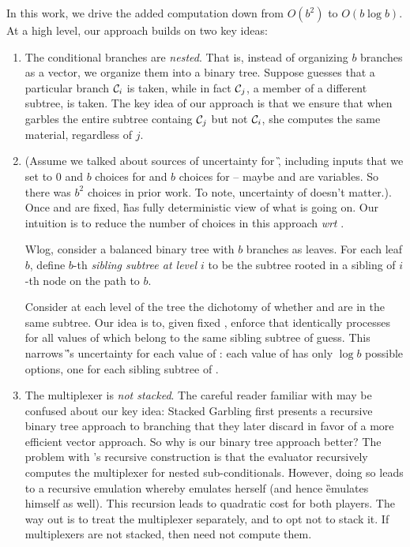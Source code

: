 In this work, we drive the added computation down from $O(b^2)$ to
$O(b \log b)$.
At a high level, our approach builds on two key ideas:
\begin{enumerate}
  \item The conditional branches are \emph{nested}.
    That is, instead of organizing $b$ branches as a vector, we
    organize them into a binary tree.
    Suppose \E guesses that a particular branch $\mathcal{C}_i$ is taken,
    while in fact $\mathcal{C}_j$, a member of a different subtree, is taken.
    The key idea of our approach is that we ensure that when \ev
    garbles the entire subtree containg $\mathcal{C}_j$ but not $\mathcal{C}_i$, she
    computes the same material, regardless of $j$.
    
  \item (Assume we talked about sources of uncertainty for \G, including inputs that we set to 0 and $b$ choices for \guess and $b$ choices for \truth -- maybe \guess and \truth are variables. So there was $b^2$ choices in prior work. To note, uncertainty of \E doesn't matter.). Once \guess and \truth are fixed, \G has fully deterministic view of what is going on.  Our intuition is to reduce the number of \truth choices in this approach {\em wrt  \guess}. 
  
  Wlog, consider a balanced binary tree with $b$ branches as leaves. 
  For each leaf $b$, define $b$-th {\em sibling subtree at level $i$} to be the subtree rooted in a sibling of $i$-th node on the path to $b$.
  
  Consider at each level of the tree the dichotomy of whether \guess and \truth are in the same subtree. Our idea is to, given fixed \guess, enforce that \E identically processes \guess for all values of \truth which belong to the same sibling subtree of guess. This narrows \G’s uncertainty for each value of \guess: each value of \guess has only $\log b$ possible \truth options, one for each sibling subtree of \guess.
    
  \item The multiplexer is \emph{not stacked}.
    The careful reader familiar with \cite{EPRINT:HeaKol20b} may be
    confused about our key idea: Stacked Garbling first presents a
    recursive binary tree approach to branching that they later
    discard in favor of a more efficient vector approach.
    So why is our binary tree approach better?
    The problem with \cite{EPRINT:HeaKol20b}'s recursive construction
    is that the evaluator recursively computes the multiplexer for
    nested sub-conditionals.
    However, doing so leads to a recursive emulation whereby \E
    emulates herself (and hence \G emulates himself as well).
    This recursion leads to quadratic cost for both players.
    The way out is to treat the multiplexer separately, and to opt not
    to stack it.
    If multiplexers are not stacked, then \E need not compute them.
\end{enumerate}


